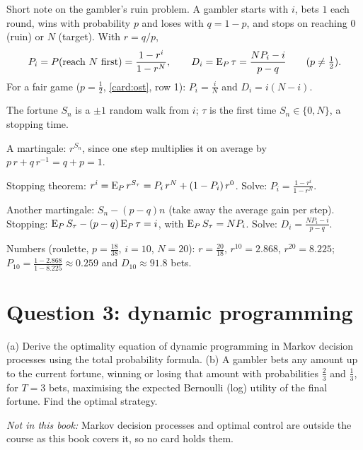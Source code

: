 \begin{problem}[Q2(c)]
Short note on the gambler's ruin problem.
\cardsays A gambler starts with $i$, bets $1$ each round, wins with probability $p$ and loses with $q=1-p$, and stops on reaching $0$ (ruin) or $N$ (target). With $r=q/p$,
\[
P_i=P(\text{reach }N\text{ first})=\frac{1-r^i}{1-r^N},\qquad D_i=\operatorname{E}_P\tau=\frac{NP_i-i}{p-q}\qquad(p\ne\tfrac12).
\]
For a fair game ($p=\frac12$, \cref{card:ost}, row 1): $P_i=\frac iN$ and $D_i=i(N-i)$.
\working
\begin{steps}
\item The fortune $S_n$ is a $\pm1$ random walk from $i$; $\tau$ is the first time $S_n\in\{0,N\}$, a stopping time.
\item A martingale: $r^{S_n}$, since one step multiplies it on average by $p\,r+q\,r^{-1}=q+p=1$.
\item Stopping theorem: $r^i=\operatorname{E}_Pr^{S_\tau}=P_i\,r^N+(1-P_i)\,r^0$. Solve: $P_i=\frac{1-r^i}{1-r^N}$.
\item Another martingale: $S_n-(p-q)n$ (take away the average gain per step). Stopping: $\operatorname{E}_PS_\tau-(p-q)\operatorname{E}_P\tau=i$, with $\operatorname{E}_PS_\tau=NP_i$. Solve: $D_i=\frac{NP_i-i}{p-q}$.
\item Numbers (roulette, $p=\frac{18}{38}$, $i=10$, $N=20$): $r=\frac{20}{18}$, $r^{10}=2.868$, $r^{20}=8.225$; $P_{10}=\frac{1-2.868}{1-8.225}\approx0.259$ and $D_{10}\approx91.8$ bets.
\end{steps}
\end{problem}

\section{Question 3: dynamic programming}

\begin{problem}[Q3(a) and Q3(b)]
(a) Derive the optimality equation of dynamic programming in Markov decision processes using the total probability formula. (b) A gambler bets any amount up to the current fortune, winning or losing that amount with probabilities $\frac23$ and $\frac13$, for $T=3$ bets, maximising the expected Bernoulli (log) utility of the final fortune. Find the optimal strategy.

\textit{Not in this book:} Markov decision processes and optimal control are outside the course as this book covers it, so no card holds them.
\end{problem}

